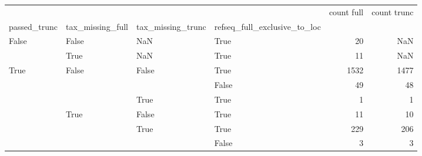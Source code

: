 \begin{tabular}{llllrr}
\toprule
 &  &  &  & count full & count trunc \\
passed_trunc & tax_missing_full & tax_missing_trunc & refseq_full_exclusive_to_loc &  &  \\
\midrule
\multirow[t]{2}{*}{False} & False & NaN & True & 20 & NaN \\
\cline{2-6} \cline{3-6}
 & True & NaN & True & 11 & NaN \\
\cline{1-6} \cline{2-6} \cline{3-6}
\multirow[t]{6}{*}{True} & \multirow[t]{3}{*}{False} & \multirow[t]{2}{*}{False} & True & 1532 & 1477 \\
 &  &  & False & 49 & 48 \\
\cline{3-6}
 &  & True & True & 1 & 1 \\
\cline{2-6} \cline{3-6}
 & \multirow[t]{3}{*}{True} & False & True & 11 & 10 \\
\cline{3-6}
 &  & \multirow[t]{2}{*}{True} & True & 229 & 206 \\
 &  &  & False & 3 & 3 \\
\cline{1-6} \cline{2-6} \cline{3-6}
\bottomrule
\end{tabular}
